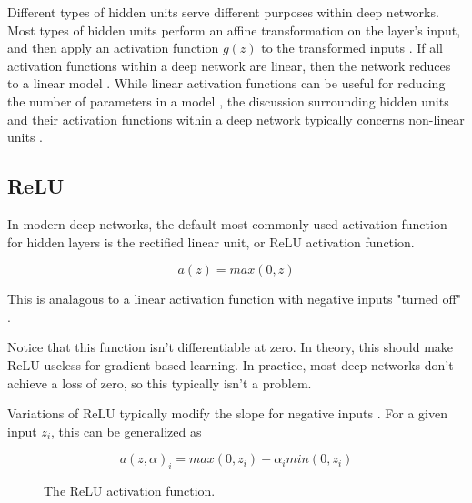 \documentclass{article}
\begin{document}
Different types of hidden units serve different purposes within deep networks. Most types of hidden units perform an affine  transformation on the layer's input, and then apply an activation function \(g(z)\) to the transformed inputs \cite{Goodfellow-et-al-2016}. If all activation functions within a deep network are linear, then the network reduces to a linear model \cite{pml1book}. While linear activation functions can be useful for reducing the number of parameters in a model , the discussion surrounding hidden units and their activation functions within a deep network typically concerns non-linear units \cite{Goodfellow-et-al-2016}. 

\subsection{ReLU}

In modern deep networks, the default most commonly used activation function for hidden layers is the rectified linear unit, or ReLU activation function.

\[a(z) = max(0, z)\]

This is analagous to a linear activation function with negative inputs "turned off" \cite{pml1book}. 

Notice that this function isn't differentiable at zero. In theory, this should make ReLU useless for gradient-based learning. In practice, most deep networks don't achieve a loss of zero, so this typically isn't a problem.

Variations of ReLU typically modify the slope for negative inputs \cite{Goodfellow-et-al-2016}. For a given input \(z_i\), this can be generalized as

\[a(z,\alpha)_i = max(0, z_i) + \alpha_i min(0,z_i)\]

\begin{figure}[h!]
    \centering
    \caption{The ReLU activation function.}
    \label{fig:relu}
\end{figure}
\end{document}
